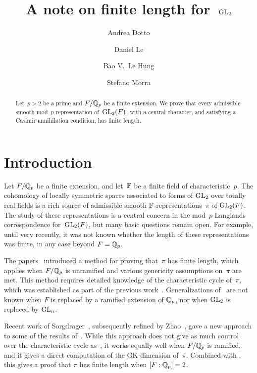 \documentclass[oneside,a4paper,english, 11pt]{amsart}
\title{A note on finite length for~$\mathrm{GL}_2$}
\author{Andrea Dotto}
\author{Daniel Le}
\author{Bao V.~Le Hung}
\author{Stefano Morra}
\begin{document}
\begin{abstract}
Let~$p>2$ be a prime and $F/\mathbb{Q}_p$ be a finite extension.
We prove that every admissible smooth mod~$p$ representation of~$\mathrm{GL}_2(F)$, with a central character, and satisfying a Casimir annihilation condition, 
has finite length.
\end{abstract} 


\maketitle


\section{Introduction}
Let $F/\mathbb{Q}_p$ be a finite extension, and let~$\mathbb{F}$ be a finite field of characteristic~$p$.
The cohomology of locally symmetric spaces associated to forms of $\mathrm{GL}_2$ over totally real fields is a rich source of
admissible smooth $\mathbb{F}$-representations~$\pi$ of $\mathrm{GL}_2(F)$.
The study of these representations is a central concern in the mod~$p$ Langlands correspondence for~$\mathrm{GL}_2(F)$, 
but many basic questions remain open.
For example, until very recently, it was not known whether the length of these representations was finite, in any case beyond $F = \mathbb{Q}_p$.

The papers~\cite{BHHMS2, BHHMSFL} introduced a method for proving that~$\pi$ has finite length, which applies when $F/\mathbb{Q}_{p}$ is 
unramified and various genericity assumptions on~$\pi$ are met.
This method requires detailed knowledge of the characteristic cycle of~$\pi$, which was established as part of the previous work~\cite{BHHMS}.
Generalizations of~\cite{BHHMS} are not known when $F$ is replaced by a ramified extension of $\mathbb{Q}_p$, nor when $\mathrm{GL}_2$ is replaced by $\mathrm{GL}_n$. 

Recent work of Sorgdrager~\cite{Sorgdrager-thesis}, subsequently refined by Zhao~\cite{Zhao}, gave a new approach to some of the results of~\cite{BHHMS}.
While this approach does not give as much control over the characteristic cycle as~\cite{BHHMS}, it works equally well when $F/\mathbb{Q}_p$ is ramified, and it gives
a direct computation of the GK-dimension of~$\pi$. 
Combined with \cite[Cor.\ 1.5]{Timmins}, this gives a proof that $\pi$ has finite length when $[F:\mathbb{Q}_p]=2$. 
\end{document}
